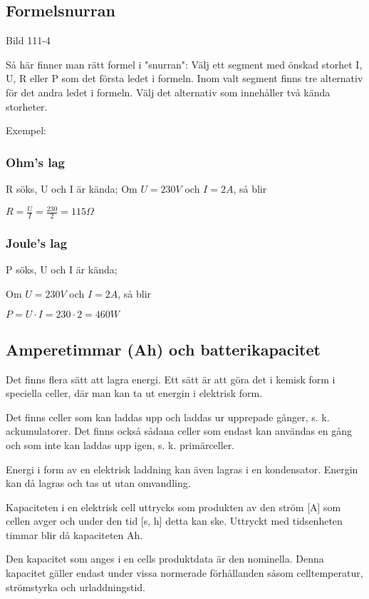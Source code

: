 \documentclass[a4paper,twoside,twocolumn,openright]{book}
\begin{document}
\subsection{Formelsnurran}

Bild 111-4

Så här finner man rätt formel i "snurran":
Välj ett segment med önskad storhet I, U, R
eller P som det första ledet i formeln. Inom
valt segment finns tre alternativ för det andra
ledet i formeln. Välj det alternativ som innehåller två kända storheter.

Exempel:

\subsubsection{Ohm's lag}

R söks, U och I är kända;
Om $U = 230 V$ och $I = 2 A$, så blir

$R=\frac{U}{I}=\frac{230}{2}=115 \Omega$

\subsubsection{Joule's lag}

P söks, U och I är kända;

Om $U = 230 V$ och $I = 2 A$, så blir

$P = U \cdot I = 230 \cdot 2 = 460 W$

\subsection{Amperetimmar (Ah) och batterikapacitet}

Det finns flera sätt att lagra energi. Ett sätt är att göra det i kemisk form i speciella
celler, där man kan ta ut energin i elektrisk form.

Det finns celler som kan laddas upp och laddas ur upprepade gånger, s. k. ackumulatorer.
Det finns också sådana celler som endast kan användas en gång och som inte
kan laddas upp igen, s. k. primärceller.

Energi i form av en elektrisk laddning kan även lagras i en kondensator. Energin kan
då lagras och tas ut utan omvandling.


Kapaciteten i en elektrisk cell uttrycks som produkten av den ström [A] som
cellen avger och under den tid [s, h] detta kan ske.
Uttryckt med tidsenheten timmar blir då kapaciteten Ah.


Den kapacitet som anges i en cells produktdata är den nominella. Denna kapacitet
gäller endast under vissa normerade förhållanden såsom celltemperatur, strömstyrka
och urladdningstid.
\end{document}
